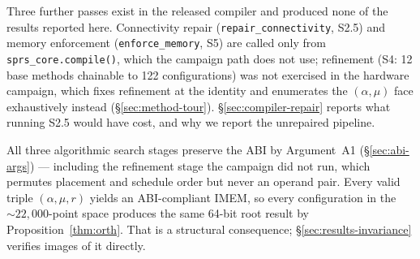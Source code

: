 \documentclass[journal,10pt]{IEEEtran}
\theoremstyle{plain}
\theoremstyle{definition}
\theoremstyle{remark}
\newcommand{\sv}[1]{\texttt{#1}}
\newcommand{\asgn}{\ensuremath{\alpha}}
\newcommand{\map}{\ensuremath{\mu}}
\begin{document}
Three further passes exist in the released compiler and produced none of the
results reported here. Connectivity repair (\sv{repair\_connectivity}, S2.5)
and memory enforcement (\sv{enforce\_memory}, S5) are called only from
\sv{sprs\_core.compile()}, which the campaign path does not use; refinement
(S4: 12 base methods chainable to 122 configurations) was not exercised in
the hardware campaign, which fixes refinement at the identity and enumerates
the $(\asgn,\map)$ face exhaustively instead (\S\ref{sec:method-tour}).
\S\ref{sec:compiler-repair} reports what running S2.5 would have cost, and
why we report the unrepaired pipeline.

All three algorithmic search stages preserve the ABI by Argument~A1
(\S\ref{sec:abi-args}) --- including the refinement stage the campaign did
not run, which permutes placement and schedule order but never an operand
pair. Every valid triple $(\asgn, \map, r)$ yields an ABI-compliant IMEM, so
every configuration in the ${\sim}22{,}000$-point space produces the same
64-bit root result by Proposition~\ref{thm:orth}. That is a structural
consequence; \S\ref{sec:results-invariance} verifies \WallTBs{} images of it
directly.
\end{document}
